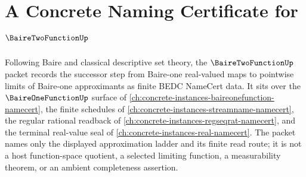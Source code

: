 \chapter{A Concrete Naming Certificate for $\BaireTwoFunctionUp$}
\label{ch:concrete-instances-baire-two-function-namecert}

Following Baire and classical descriptive set theory, the $\BaireTwoFunctionUp$ packet records the successor step from Baire-one real-valued maps to pointwise limits of Baire-one approximants as finite BEDC NameCert data. It sits over the $\BaireOneFunctionUp$ surface of \autoref{ch:concrete-instances-baireonefunction-namecert}, the finite schedules of \autoref{ch:concrete-instances-streamname-namecert}, the regular rational readback of \autoref{ch:concrete-instances-regseqrat-namecert}, and the terminal real-value seal of \autoref{ch:concrete-instances-real-namecert}. The packet names only the displayed approximation ladder and its finite read route; it is not a host function-space quotient, a selected limiting function, a measurability theorem, or an ambient completeness assertion.

